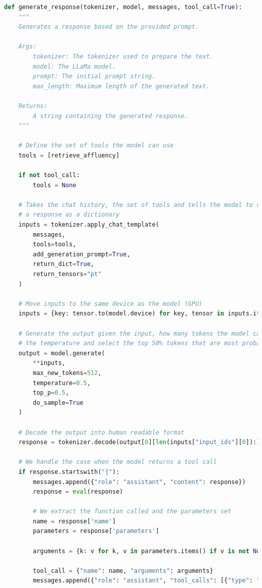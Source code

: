 \begin{center}
\begin{lstlisting}[language=Python, frame=single, caption=\texttt{generate\_response()} Function.]
def generate_response(tokenizer, model, messages, tool_call=True):
    """
    Generates a response based on the provided prompt.

    Args:
        tokenizer: The tokenizer used to prepare the text.
        model: The LLaMa model.
        prompt: The initial prompt string.
        max_length: Maximum length of the generated text.

    Returns:
        A string containing the generated response.
    """

    # Define the set of tools the model can use
    tools = [retrieve_affluency]

    if not tool_call:
        tools = None

    # Takes the chat history, the set of tools and tells the model to return
    # a response as a dictionary
    inputs = tokenizer.apply_chat_template(
        messages,
        tools=tools,
        add_generation_prompt=True,
        return_dict=True,
        return_tensors="pt"
    )

    # Move inputs to the same device as the model (GPU)
    inputs = {key: tensor.to(model.device) for key, tensor in inputs.items()}

    # Generate the output given the input, how many tokens the model can use,
    # the temperature and select the top 50% tokens that are most probable
    output = model.generate(
        **inputs,
        max_new_tokens=512,
        temperature=0.5,
        top_p=0.5,
        do_sample=True
    )

    # Decode the output into human readable format
    response = tokenizer.decode(output[0][len(inputs["input_ids"][0]):], skip_special_tokens=True)

    # We handle the case when the model returns a tool call
    if response.startswith("{"):
        messages.append({"role": "assistant", "content": response})
        response = eval(response)

        # We extract the function called and the parameters set
        name = response['name']
        parameters = response['parameters']

        arguments = {k: v for k, v in parameters.items() if v is not None}

        tool_call = {"name": name, "arguments": arguments}
        messages.append({"role": "assistant", "tool_calls": [{"type": "function", "function": tool_call}]})


\end{lstlisting}
\end{center}

